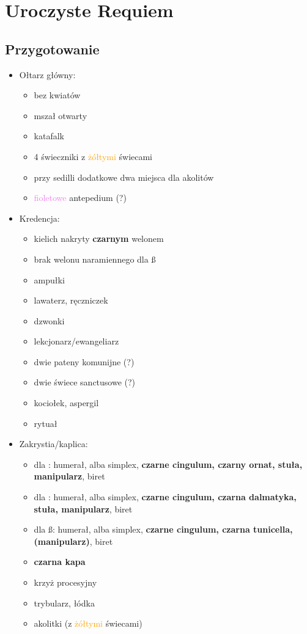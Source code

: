 \chapter{Uroczyste Requiem}

\section{Przygotowanie}%

\begin{itemize}
	\item Ołtarz główny:
		\begin{itemize}
			\item bez kwiatów
			\item mszał otwarty
			\item katafalk
			\item 4 świeczniki z \textcolor{orange}{żółtymi} świecami
			\item przy sedilli dodatkowe dwa miejsca dla akolitów
			\item \textcolor{violet}{fioletowe} antepedium (?)
		\end{itemize}
	\item Kredencja:
		\begin{itemize}
			\item kielich nakryty \textbf{czarnym} welonem
			\item brak welonu naramiennego dla \ss
			\item ampułki
			\item lawaterz, ręczniczek
			\item dzwonki
			\item lekcjonarz/ewangeliarz
			\item dwie pateny komunijne (?)
			\item dwie świece sanctusowe (?)
			\item kociołek, aspergil
			\item rytuał
		\end{itemize}
	\item Zakrystia/kaplica:
		\begin{itemize}
			\item dla \ii: humerał, alba simplex, \textbf{czarne
				cingulum, czarny ornat, stuła, manipularz},
				biret
			\item dla \dd: humerał, alba simplex, \textbf{czarne cingulum,
				czarna dalmatyka, stuła, manipularz}, biret
			\item dla \ss: humerał, alba simplex, \textbf{czarne cingulum,
				czarna tunicella, (manipularz)}, biret
			\item \textbf{czarna kapa}
			\item krzyż procesyjny
			\item trybularz, łódka
			\item akolitki (z \textcolor{orange}{żółtymi} świecami)
		\end{itemize}
\end{itemize}

